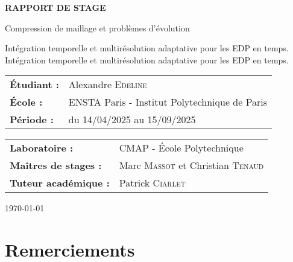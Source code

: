 \documentclass[11pt]{report}
\theoremstyle{definition}
\theoremstyle{remark}
\newcommand{\authorname}{Alexandre \textsc{Edeline}}
\newcommand{\studentschool}{ENSTA Paris - Institut Polytechnique de Paris}
\newcommand{\companyname}{CMAP - École Polytechnique}
\newcommand{\supervisor}{Marc \textsc{Massot} et Christian \textsc{Tenaud}}
\newcommand{\academicsupervisor}{Patrick \textsc{Ciarlet}}
\newcommand{\internshipperiod}{du 14/04/2025 au 15/09/2025}
\newcommand{\reporttitle}{Compression de maillage et problèmes d'évolution}
\newcommand{\reportsubtitle}{Intégration temporelle et multirésolution adaptative pour les EDP en temps.}
\begin{document}
\begin{titlepage}
    \centering
    
    
    \vspace{2cm}
    
    {\LARGE \textbf{RAPPORT DE STAGE}}
    
    \vspace{1cm}
    
    {\Large \reporttitle}
    
    \ifx\reportsubtitle\empty
    \else
        \vspace{0.5cm}
        {\large \reportsubtitle}
    \fi
    
    \vspace{2cm}
    
    \begin{tabular}{ll}
        \textbf{Étudiant :} & \authorname \\
        \textbf{École :} & \studentschool \\
        \textbf{Période :} & \internshipperiod \\
    \end{tabular}
    
    \vspace{2cm}
    
    \begin{tabular}{ll}
        \textbf{Laboratoire :} & \companyname \\
        \textbf{Maîtres de stages :} & \supervisor \\
        \textbf{Tuteur académique :} & \academicsupervisor \\
    \end{tabular}
    
    \vfill
    
    
    \vspace{1cm}
    
    {\large \today}
    
\end{titlepage}

\newpage
\thispagestyle{empty}
\mbox{}

\newpage
\section*{Remerciements}
\end{document}
